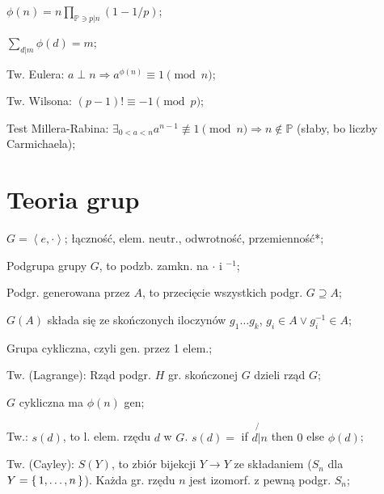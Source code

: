 \documentclass[10pt,a4paper,twocolumn]{article}
\newcommand{\angles}[1]{\left\langle #1 \right\rangle}
\begin{document}
$\phi(n) = n\prod_{\mathbb{P} \ni p | n}(1- 1/p)$;

$\sum_{d|m}\phi(d) = m$;

Tw. Eulera: $a\perp n \Rightarrow a^{\phi(n)} \equiv 1 \pmod{n}$;


Tw. Wilsona: $(p-1)! \equiv -1 \pmod{p}$;


Test Millera-Rabina: $\exists_{0<a<n}a^{n-1}\not\equiv 1 \pmod{n} \Rightarrow
  n \not\in \mathbb{P}$ (słaby, bo liczby Carmichaela);




\section{Teoria grup}

$G = \angles{e, \cdot}$; łączność, elem. neutr., odwrotność, przemienność*;

Podgrupa grupy $G$, to podzb. zamkn. na $\cdot$ i $^{-1}$;

Podgr. generowana przez $A$, to przecięcie wszystkich podgr. $G \supseteq A$;

$G(A)$ składa się ze skończonych iloczynów $g_1\dots g_k$,
  $g_i\in A \lor g_i^{-1} \in A$;

Grupa cykliczna, czyli gen. przez 1 elem.;

Tw. (Lagrange): Rząd podgr. $H$ gr. skończonej $G$ dzieli rząd $G$;

$G$ cykliczna ma $\phi(n)$ gen;

Tw.: $s(d)$, to l. elem. rzędu $d$ w $G$. $s(d) =$ if $d \not{|} n$ then $0$
  else $\phi(d)$;

Tw. (Cayley): $S(Y)$, to zbiór bijekcji $Y \rightarrow Y$ ze składaniem
  ($S_n$ dla $Y=\set{1,\dots,n}$). Każda gr. rzędu $n$ jest izomorf. z pewną
  podgr.  $S_n$;

\end{document}
